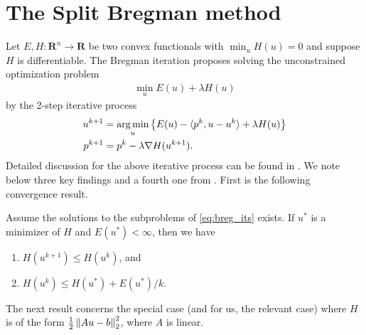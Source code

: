 \chapter{The Split Bregman method}
\label{appdx:sb}
Let $E, H: \mathbf{R}^n \rightarrow \mathbf{R}$ be two convex functionals with $\min_u H(u) = 0$ and suppose $H$ is differentiable. The Bregman iteration proposes solving the unconstrained optimization problem 
\begin{align*}
\min_u E(u) + \lambda H(u)
\end{align*}
by the 2-step iterative process 
\begin{align}
\begin{split} 
u^{k+1} &= \operatorname*{arg\,min}_u \left\{ E(u) - \langle p^k, u - u^k \rangle + \lambda H(u)  \right\}
\\
p^{k+1} &= p^k - \lambda\nabla H(u^{k+1}).  
\end{split}
\label{eq:breg_its}
\end{align}
Detailed discussion for the above iterative process can be found in \cite{osher2005iterative}. We note below three key findings and a fourth one from \cite{goldstein2010geometric}. First is the following convergence result.
\begin{thm}
	Assume the solutions to the subproblems of \eqref{eq:breg_its} exists. If $u^*$ is a minimizer of $H$ and $E(u^*) < \infty$, then we have 
	\begin{enumerate}
		\item $H(u^{k+1}) \leq H(u^{k})$, and 
		\item $H(u^k) \leq H(u^*)  + E(u^*) / k$.
	\end{enumerate}
\end{thm} 
The next result concerns the special case (and for us, the relevant case) where $H$ is of the form $\frac{1}{2}\left\lVert Au - b\right\rVert^2_2$, where $A$ is linear. 

